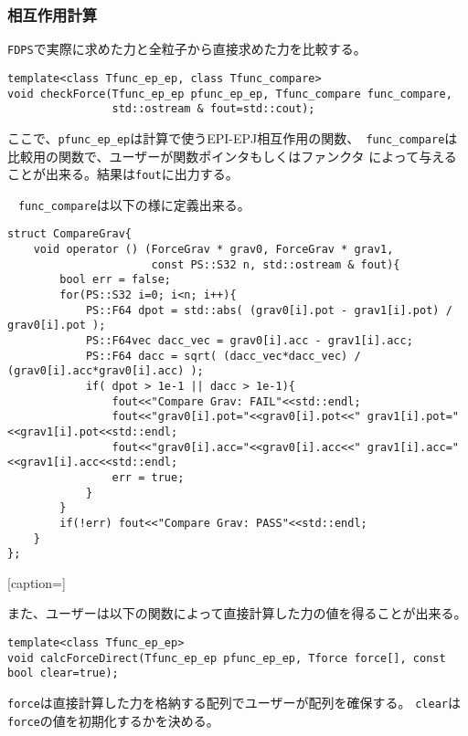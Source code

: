 \subsubsection{相互作用計算}

{\tt FDPS}で実際に求めた力と全粒子から直接求めた力を比較する。

\begin{screen}
\begin{verbatim}
template<class Tfunc_ep_ep, class Tfunc_compare>
void checkForce(Tfunc_ep_ep pfunc_ep_ep, Tfunc_compare func_compare,
                std::ostream & fout=std::cout);
\end{verbatim}
\end{screen}

ここで、{\tt pfunc\_ep\_ep}は計算で使うEPI-EPJ相互作用の関数、{\tt
func\_compare}は比較用の関数で、ユーザーが関数ポインタもしくはファンクタ
によって与えることが出来る。結果は{\tt fout}に出力する。

{\tt　func\_compare}は以下の様に定義出来る。
\begin{lstlisting}[caption=力の比較用ファンクタ]
struct CompareGrav{
    void operator () (ForceGrav * grav0, ForceGrav * grav1, 
                      const PS::S32 n, std::ostream & fout){
        bool err = false;
        for(PS::S32 i=0; i<n; i++){
            PS::F64 dpot = std::abs( (grav0[i].pot - grav1[i].pot) / grav0[i].pot );
            PS::F64vec dacc_vec = grav0[i].acc - grav1[i].acc;
            PS::F64 dacc = sqrt( (dacc_vec*dacc_vec) / (grav0[i].acc*grav0[i].acc) );
            if( dpot > 1e-1 || dacc > 1e-1){
                fout<<"Compare Grav: FAIL"<<std::endl;
                fout<<"grav0[i].pot="<<grav0[i].pot<<" grav1[i].pot="<<grav1[i].pot<<std::endl;
                fout<<"grav0[i].acc="<<grav0[i].acc<<" grav1[i].acc="<<grav1[i].acc<<std::endl;
                err = true;
            }
        }
        if(!err) fout<<"Compare Grav: PASS"<<std::endl;
    }
};
\end{lstlisting}[caption=]

また、ユーザーは以下の関数によって直接計算した力の値を得ることが出来る。
\begin{screen}
\begin{verbatim}
template<class Tfunc_ep_ep>
void calcForceDirect(Tfunc_ep_ep pfunc_ep_ep, Tforce force[], const bool clear=true);
\end{verbatim}
\end{screen}
{\tt force}は直接計算した力を格納する配列でユーザーが配列を確保する。
{\tt clear}は{\tt force}の値を初期化するかを決める。

